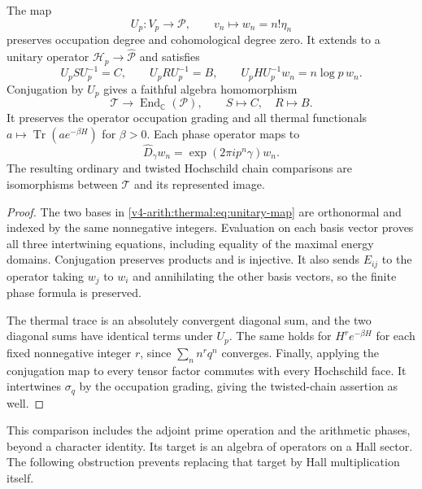 \begin{theorem}
\label{v4-arith:thermal:thm:hall-module}
The map
\begin{equation}
 U_p:V_p\longrightarrow\mathcal P,
 \qquad v_n\longmapsto w_n=n!\eta_n
 \label{v4-arith:thermal:eq:unitary-map}
\end{equation}
preserves occupation degree and cohomological degree zero. It
extends to a unitary operator
$\mathscr H_p\to\widehat{\mathcal P}$ and satisfies
\[
 U_pSU_p^{-1}=C,\qquad U_pRU_p^{-1}=B,
 \qquad U_pHU_p^{-1}w_n=n\log p\,w_n.
\]
Conjugation by $U_p$ gives a faithful algebra homomorphism
\[
 \mathcal T\longrightarrow\operatorname{End}_{\mathbb C}(\mathcal P),
 \qquad S\mapsto C,\quad R\mapsto B.
\]
It preserves the operator occupation grading and all thermal
functionals $a\mapsto\operatorname{Tr}(a e^{-\beta H})$ for
$\beta>0$. Each phase operator maps to
\[
 \widehat D_\gamma w_n=\exp(2\pi i p^n\gamma)w_n.
\]
The resulting ordinary and twisted Hochschild chain comparisons
are isomorphisms between $\mathcal T$ and its represented image.
\end{theorem}

\begin{proof}
The two bases in \eqref{v4-arith:thermal:eq:unitary-map} are orthonormal and
indexed by the same nonnegative integers. Evaluation on each
basis vector proves all three intertwining equations, including
equality of the maximal energy domains. Conjugation preserves
products and is injective. It also sends $E_{ij}$ to the operator
taking $w_j$ to $w_i$ and annihilating the other basis vectors,
so the finite phase formula is preserved.

The thermal trace is an absolutely convergent diagonal sum, and
the two diagonal sums have identical terms under $U_p$. The same
holds for $H^r e^{-\beta H}$ for each fixed nonnegative integer
$r$, since $\sum_n n^r q^n$ converges. Finally, applying the
conjugation map to every tensor factor commutes with every
Hochschild face. It intertwines $\sigma_q$ by the occupation
grading, giving the twisted-chain assertion as well.
\end{proof}

This comparison includes the adjoint prime operation and the
arithmetic phases, beyond a character identity. Its target is an
algebra of operators on a Hall sector. The following obstruction
prevents replacing that target by Hall multiplication itself.

